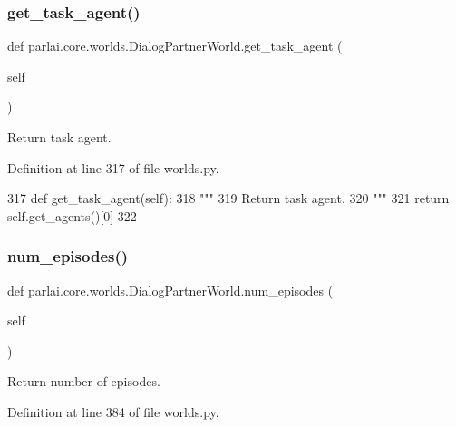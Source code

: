 \subsubsection{\texorpdfstring{get\+\_\+task\+\_\+agent()}{get\_task\_agent()}}
{\footnotesize\ttfamily def parlai.\+core.\+worlds.\+Dialog\+Partner\+World.\+get\+\_\+task\+\_\+agent (\begin{DoxyParamCaption}\item[{}]{self }\end{DoxyParamCaption})}

\begin{DoxyVerb}Return task agent.
\end{DoxyVerb}
 

Definition at line 317 of file worlds.\+py.


\begin{DoxyCode}
317     \textcolor{keyword}{def }get\_task\_agent(self):
318         \textcolor{stringliteral}{"""}
319 \textcolor{stringliteral}{        Return task agent.}
320 \textcolor{stringliteral}{        """}
321         \textcolor{keywordflow}{return} self.get\_agents()[0]
322         
\end{DoxyCode}
\mbox{\label{classparlai_1_1core_1_1worlds_1_1DialogPartnerWorld_ab34285faaee3830fbf1d9d53869ec47c}} 
\subsubsection{\texorpdfstring{num\+\_\+episodes()}{num\_episodes()}}
{\footnotesize\ttfamily def parlai.\+core.\+worlds.\+Dialog\+Partner\+World.\+num\+\_\+episodes (\begin{DoxyParamCaption}\item[{}]{self }\end{DoxyParamCaption})}

\begin{DoxyVerb}Return number of episodes.
\end{DoxyVerb}
 

Definition at line 384 of file worlds.\+py.


